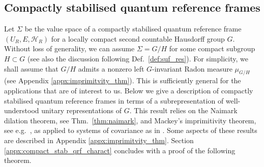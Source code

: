 \documentclass[sn-mathphys-num]{sn-jnl}%
\newcommand{\HH}{\mathcal{H}}
\numberwithin{equation}{section}
\theoremstyle{thmstyleone}%
\theoremstyle{thmstyletwo}%
\theoremstyle{thmstylethree}%
\begin{document}
\subsection{Compactly stabilised quantum reference frames}

Let $\Sigma$ be the value space of a compactly stabilised quantum reference frame $(U_R,E,\HH_R)$ for a locally compact second countable Hausdorff group $G$. Without loss of generality, we can assume $\Sigma=G/H$ for some compact subgroup $H\subset G$ (see also the discussion following Def.~\ref{def:suf_res}). For simplicity, we shall assume that $G/H$ admits a nonzero left $G$-invariant Radon measure $\mu_{G/H}$ (see Appendix \ref{appx:imprimitvity_thm}). This is sufficiently general for the applications that are of interest to us. Below we give a description of compactly stabilised quantum reference frames in terms of a subrepresentation of well-understood unitary representations of $G$. This result relies on the Naimark dilation theorem, see Thm.\ \ref{thm:naimark}, and Mackey's imprimitivity theorem, see e.g.\ \cite{kaniuth2012induced}, as applied to systems of covariance as in \cite{Cattaneo:1979}. Some aspects of these results are described in Appendix \ref{appx:imprimitvity_thm}. Section \ref{appx:compact_stab_qrf_charact} concludes with a proof of the following theorem.
\end{document}
